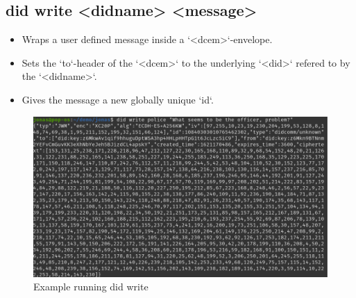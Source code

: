 \subsection{did write <didname> <message>}
\begin{itemize}
\item Wraps a user defined message inside a `<dcem>`-envelope.
\item Sets the `to`-header of the `<dcem>` to the underlying `<did>` refered to by the `<didname>`.
\item Gives the message a new globally unique `id`.
\end{itemize}
    \begin{figure}[htbp]
      \centering
      \includegraphics[width=.6\textwidth]{figures/cmd-write.png}
      \caption[]{Example running did write}
    \end{figure}
\newpage

